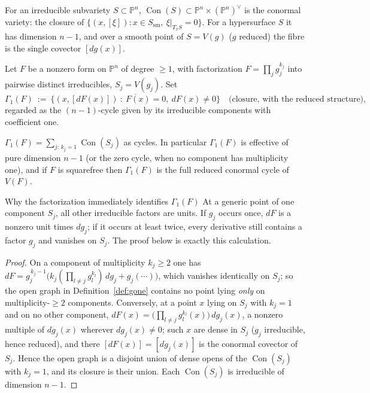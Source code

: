 \documentclass[acmsmall,screen,nonacm]{acmart}
\theoremstyle{definition}
\theoremstyle{remark}
\DeclareMathOperator{\Con}{Con}
\newcommand{\PP}{\mathbb{P}}
\newcommand{\Gone}{\Gamma_{\!1}}
\begin{document}
For an irreducible subvariety $S\subset\PP^n$, $\Con(S)\subset
\PP^n\times(\PP^n)^\vee$ is the conormal variety: the closure of
$\{(x,[\xi]): x\in S_{\mathrm{sm}},\ \xi|_{T_xS}=0\}$.  For a
hypersurface $S$ it has dimension $n-1$, and over a smooth point of
$S=V(g)$ ($g$ reduced) the fibre is the single covector $[dg(x)]$.

\begin{definition}\label{def:gone}
Let $F$ be a nonzero form on $\PP^n$ of degree $\ge1$, with
factorization $F=\prod_j g_j^{k_j}$ into pairwise distinct
irreducibles, $S_j=V(g_j)$.  Set
\[
  \Gone(F)\ :=\ \overline{\big\{(x,[dF(x)])\ :\ F(x)=0,\
  dF(x)\ne0\big\}}\quad\text{(closure, with the reduced structure)},
\]
regarded as the $(n-1)$-cycle given by its irreducible components with
coefficient one.
\end{definition}

\begin{lemma}[Structure of $\Gone$]\label{lem:gonestructure}
$\Gone(F)=\sum_{j:\,k_j=1}\Con(S_j)$ as cycles.  In particular
$\Gone(F)$ is effective of pure dimension $n-1$ (or the zero cycle,
when no component has multiplicity one), and if $F$ is squarefree then
$\Gone(F)$ is the full reduced conormal cycle of $V(F)$.
\end{lemma}

\begin{intuitionbox}{Why the factorization immediately identifies $\Gone(F)$}
At a generic point of one component $S_j$, all other irreducible factors are
units.  If $g_j$ occurs once, $dF$ is a nonzero unit times $dg_j$; if it
occurs at least twice, every derivative still contains a factor $g_j$ and
vanishes on $S_j$.  The proof below is exactly this calculation.
\end{intuitionbox}

\begin{proof}
On a component of multiplicity $k_j\ge2$ one has
$dF=g_j^{\,k_j-1}\big(k_j(\prod_{l\ne j}g_l^{k_l})\,dg_j+g_j(\cdots)\big)$,
which vanishes identically on $S_j$; so the open graph in
Definition~\ref{def:gone} contains no point lying \emph{only} on
multiplicity-$\ge2$ components.  Conversely, at a point $x$ lying on
$S_j$ with $k_j=1$ and on no other component, $dF(x)=
\big(\prod_{l\ne j}g_l^{k_l}(x)\big)\,dg_j(x)$, a nonzero multiple of
$dg_j(x)$ wherever $dg_j(x)\ne0$; such $x$ are dense in $S_j$ ($g_j$
irreducible, hence reduced), and there $[dF(x)]=[dg_j(x)]$ is the
conormal covector of $S_j$.  Hence the open graph is a disjoint union
of dense opens of the $\Con(S_j)$ with $k_j=1$, and its closure is
their union.  Each $\Con(S_j)$ is irreducible of dimension $n-1$.
\end{proof}
\end{document}
